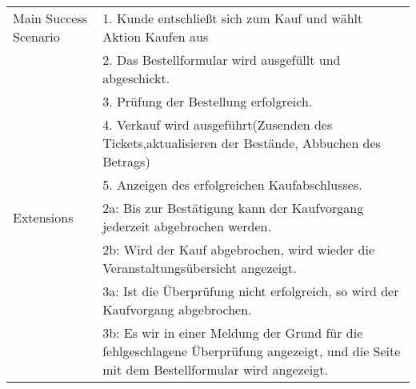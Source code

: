 \begin{tabular}{p{} p{}}
	             \hline
	Main Success Scenario & 1. Kunde entschließt sich zum Kauf und wählt Aktion Kaufen aus \\
						& 2. Das Bestellformular wird ausgefüllt und abgeschickt.\\
						& 3. Prüfung der Bestellung erfolgreich.\\
						& 4. Verkauf wird ausgeführt(Zusenden des Tickets,aktualisieren der Bestände, Abbuchen des Betrags)\\
						& 5. Anzeigen des erfolgreichen Kaufabschlusses.\\
	\hline
	Extensions & 2a: Bis zur Bestätigung kann der Kaufvorgang jederzeit abgebrochen werden.\\
	           & 2b: Wird der Kauf abgebrochen, wird wieder die Veranstaltungsübersicht angezeigt.\\
	           & 3a: Ist die Überprüfung nicht erfolgreich, so wird der Kaufvorgang abgebrochen.\\
	           & 3b: Es wir in einer Meldung der Grund für die fehlgeschlagene Überprüfung angezeigt, und die Seite mit dem Bestellformular wird angezeigt. \\
	\hline           
\end{tabular} 